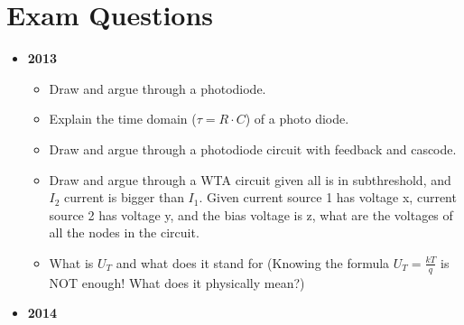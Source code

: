 \documentclass[main]{subfiles}
\begin{document}
\section{Exam Questions}
\begin{itemize}
\item \textbf{2013}
\begin{itemize}
\item Draw and argue through a photodiode.
\item Explain the time domain ($\tau = R\cdot C$) of a photo diode.
\item Draw and argue through a photodiode circuit with feedback and cascode.
\item Draw and argue through a WTA circuit given all is in subthreshold, and $I_2$ current is bigger than $I_1$.
\subitem Given current source 1 has voltage x, current source 2 has voltage y, and the bias voltage is z, what are the voltages of all the nodes in the circuit.
\item What is $U_T$ and what does it stand for (Knowing the formula $U_T=\frac{kT}{q}$ is NOT enough! What does it physically mean?)
\end{itemize}
\item \textbf{2014}
\end{itemize}
\end{document}
